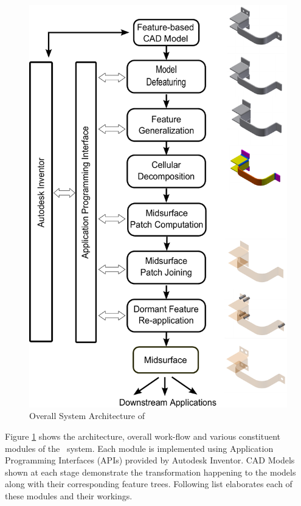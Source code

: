 

	 \begin{figure} [!h]
	\centering
	\includegraphics[width=0.62\linewidth]{../Common/images/SystemArchitecture_nolabels_7.pdf}
	\caption{Overall System Architecture of \mysystemname}
	\label{fig:proposal:OverallWorkflow}
	\end{figure}
	
	
Figure \ref{fig:proposal:OverallWorkflow} shows the architecture, overall work-flow and various constituent modules of the \mysystemname~system. Each module is implemented using Application Programming Interfaces (APIs)  provided by Autodesk Inventor. CAD Models shown at each stage demonstrate the transformation happening to the models along with their corresponding feature trees. Following list elaborates each of these modules and their workings.
	
